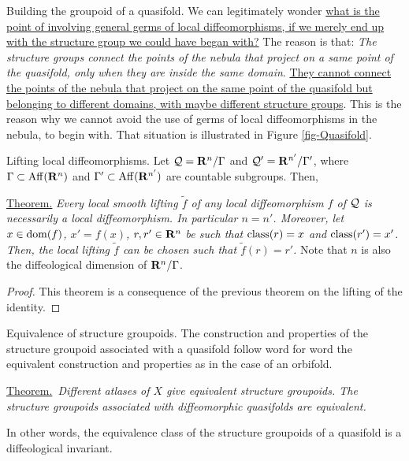 \begin{Article}{Building the groupoid of a quasifold.}{}
  We can legitimately wonder \uline{what is the point of involving general germs of local diffeomorphisms,
  if we merely end up with the structure group we could have began with?}
  The reason is that: \emph{The structure groups connect the points of the nebula that project on a same point of the quasifold,
  only when they are inside the same domain}.
  \uline{They cannot connect the points of the nebula that project on the same point of the quasifold but belonging to different domains,
  with maybe different structure groups}.
  This is the reason why we cannot avoid the use of germs of local diffeomorphisms in the nebula,
  to begin with.
  That situation is illustrated in Figure \ref{fig-Quasifold}. %
\end{Article} %

\begin{Article}{Lifting local diffeomorphisms.}{}
  Let $\mathcal{Q} = \mathbf{R}^n/\Gamma$ and $\mathcal{Q}' = \mathbf{R}^{n'}/\Gamma'$,
  where $\Gamma \subset \operatorname{Aff}(\mathbf{R}^n)$ and $\Gamma' \subset \operatorname{Aff}(\mathbf{R}^{n'})$ are countable subgroups.
  Then,
  
  \uline{Theorem.} {\itshape Every local smooth lifting $\tilde f$ of any local diffeomorphism $f$ of $\mathcal{Q}$ is necessarily a local diffeomorphism.
  In particular $n = n'$.
  Moreover,
  let $x \in \mathrm{dom}(f)$,
  $x' = f(x)$,
  $r, r' \in \mathbf{R}^n$ be such that $\operatorname{class}(r) = x$ and $\operatorname{class}(r') = x'$.
  Then,
  the local lifting $\tilde f$ can be chosen such that $\tilde f(r) = r'$.}
  Note that $n$ is also the diffeological dimension of $\mathbf{R}^n/\Gamma$.
\end{Article} %

\begin{proof}
  This theorem is a consequence of the previous theorem on the lifting of the identity.
\end{proof}

\begin{Article}{Equivalence of structure groupoids.}{}
  \label{art-NGC-Equivalence-Of-Structure-Groupoids}
  The construction and properties of the structure groupoid associated with a quasifold follow word for word the equivalent construction and properties as in the case of an orbifold.
  
  
  \uline{Theorem.}{\itshape~Different atlases of $X$ give equivalent structure groupoids.
  The structure groupoids associated with diffeomorphic quasifolds are equivalent.}
  
  In other words,
  the equivalence class of the structure groupoids of a quasifold is a diffeological invariant.
\end{Article} %

